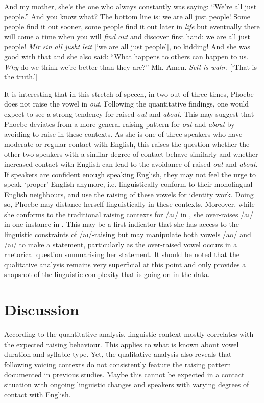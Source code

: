 \documentclass[output=paper]{langscibook}
\begin{document}
\begin{exe}
    \ex\label{neuhausen:ex:12} And \ul{my} mother, she’s the one who always constantly was saying: “We’re all just people.” And you know what? The bottom \ul{line} is: we are all just people! Some people \ul{find} it \ul{out} sooner, some people \ul{find} it \ul{out} later in \textit{life} but eventually there will come a \ul{time} when you will \textit{find out} and discover first hand: we are all just people! \textit{Mir sin all jusht leit} [‘we are all just people’], no kidding! And she was good with that and she also said: “What happens to others can happen to us. \textit{Why} do we think we’re better than they are?” Mh. Amen. \textit{Sell is wahr}. [‘That is the truth.’]
\end{exe}


It is interesting that in this stretch of speech, in two out of three times, Phoebe does not raise the vowel in \textit{out}. Following the quantitative findings, one would expect to see a strong tendency for raised \textit{out} and \textit{about}. This may suggest that Phoebe deviates from a more general raising pattern for \textit{out} and \textit{about} by avoiding to raise in these contexts. As she is one of three speakers who have moderate or regular contact with English, this raises the question whether the other two speakers with a similar degree of contact behave similarly and whether increased contact with English can lead to the avoidance of raised \textit{out} and \textit{about}. If speakers are confident enough speaking English, they may not feel the urge to speak ‘proper’ English anymore, i.e. linguistically conform to their monolingual English neighbours, and use the raising of these vowels for identity work. Doing so, Phoebe may distance herself linguistically in these contexts. Moreover, while she conforms to the traditional raising contexts for /aɪ/ in , she over-raises /aɪ/ in one instance in . This may be a first indicator that she has access to the linguistic constraints of /aɪ/-raising but may manipulate both vowels /aʊ/ and /aɪ/ to make a statement, particularly as the over-raised vowel occurs in a rhetorical question summarising her statement. It should be noted that the qualitative analysis remains very superficial at this point and only provides a snapshot of the linguistic complexity that is going on in the data.

\section{Discussion}
According to the quantitative analysis, linguistic context mostly correlates with the expected raising behaviour. This applies to what is known about vowel duration and syllable type. Yet, the qualitative analysis also reveals that following voicing contexts do not consistently feature the raising pattern documented in previous studies. Maybe this cannot be expected in a contact situation with ongoing linguistic changes and speakers with varying degrees of contact with English. 
\end{document}

